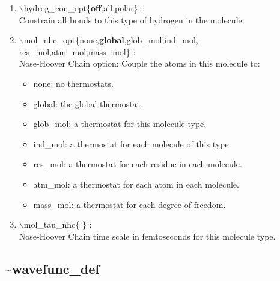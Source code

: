 \documentclass[12pt,titlepage]{article}
\begin{document}
\begin{enumerate}
 \vspace{0.15in} 
 \item  $\backslash$hydrog\_con\_opt\{{\bf off},all,polar\} : \\
   Constrain all bonds to this type of hydrogen in the molecule.

 \vspace{0.15in} 
 \item  $\backslash$mol\_nhc\_opt\{none,{\bf global},glob\_mol,ind\_mol,\\ 
                 \hspace*{0.5in}res\_mol,atm\_mol,mass\_mol\} :  \\
   Nose-Hoover Chain option: Couple the atoms in this molecule to:
      \begin{itemize}
         \item none:     no thermostats.
         \item global:   the global thermostat.
         \item glob\_mol: a thermostat for this molecule type. 
         \item ind\_mol:  a thermostat for each molecule of this type. 
         \item res\_mol:  a thermostat for each residue in each molecule.
         \item atm\_mol:  a thermostat for each atom in each molecule.
         \item mass\_mol: a thermostat for each degree of freedom.
      \end{itemize}

 \vspace{0.15in} 
 \item  $\backslash$mol\_tau\_nhc\{ \} : \\
   Nose-Hoover Chain time scale in femtoseconds for this molecule type.

\end{enumerate}

\newpage
\subsection*{\bf \~{}wavefunc\_def}
\end{document}
